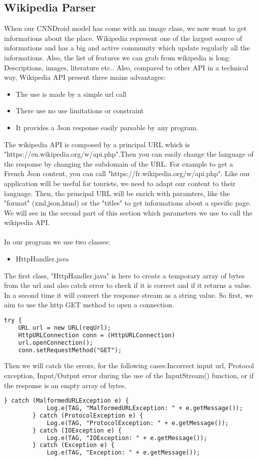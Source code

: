 \subsection {Wikipedia Parser}
When our CNNDroid model has come with an image class, we now want to get informations about the place. Wikipedia represent one of the largest source of informations and has a big and active community which update regularly all the informations. Also, the list of features we can grab from wikipedia is long: Descriptions, images, literature etc..
Also, compared to other API in a technical way, Wikipedia API present three mains advantages:
\begin{itemize}
    \item{The use is made by a simple url call}
    \item{There use no use limitations or constraint}
    \item{It provides a Json response easily parsable by any program. }
\end{itemize}
The wikipedia API is composed by a principal URL which is "https://en.wikipedia.org/w/api.php".Then you can easily change the language of the response by changing the subdomain of the URL. For example to get a French Json content, you can call "https://fr.wikipedia.org/w/api.php". Like our application will be useful for tourists, we need to adapt our content to their language.
Then, the principal URL will be enrich with paramters, like the "format" (xml,json,html) or the "titles" to get informations about a specific page. We will see in the second part of this section which parameters we use to call the wikipedia API.\\\\
In our program we use two classes:
\begin{itemize}
    \item{HttpHandler.java}
\end{itemize}
The first class, "HttpHandler.java" is here to create a temporary array of bytes from the url and also catch error to check if it is correct and if it returns a value. In a second time it will convert the response stream as a string value.
So first, we aim to use the http GET method to open a connection.
\begin{lstlisting}[language=XML, basicstyle=\scriptsize]
try {
    URL url = new URL(reqUrl);
    HttpURLConnection conn = (HttpURLConnection)
    url.openConnection();
    conn.setRequestMethod("GET");
\end{lstlisting}
Then we will catch the errors, for the following cases:Incorrect input url, Protocol exception, Input/Output error during the use of the InputStream() function, or if the response is an empty array of bytes.
\begin{lstlisting}[language=XML, basicstyle=\scriptsize]
    } catch (MalformedURLException e) {
            Log.e(TAG, "MalformedURLException: " + e.getMessage());
        } catch (ProtocolException e) {
            Log.e(TAG, "ProtocolException: " + e.getMessage());
        } catch (IOException e) {
            Log.e(TAG, "IOException: " + e.getMessage());
        } catch (Exception e) {
            Log.e(TAG, "Exception: " + e.getMessage());
\end{lstlisting}

